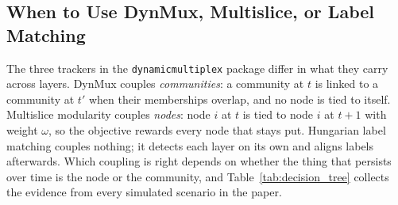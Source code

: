 
\subsection{When to Use DynMux, Multislice, or Label Matching}
\label{sec:when_to_use}

The three trackers in the \texttt{dynamicmultiplex} package differ in what
they carry across layers. DynMux couples \emph{communities}: a community at
$t$ is linked to a community at $t'$ when their memberships overlap, and no
node is tied to itself. Multislice modularity couples \emph{nodes}: node $i$
at $t$ is tied to node $i$ at $t+1$ with weight $\omega$, so the objective
rewards every node that stays put. Hungarian label matching couples nothing;
it detects each layer on its own and aligns labels afterwards. Which coupling
is right depends on whether the thing that persists over time is the node or
the community, and Table~\ref{tab:decision_tree} collects the evidence from
every simulated scenario in the paper.

\begin{table}[t]
\centering\small
\caption{Joint NMI of the tracked partition by scenario (means over
replicates; Table 2 regimes use 30 replicates per configuration, the
mechanism and lineage regimes 10 and 30). Multislice uses adjacent-layer
links except where the generator supplies period links. Margin is the gap
between the best method and the runner-up.}
\label{tab:decision_tree}

\end{table}


